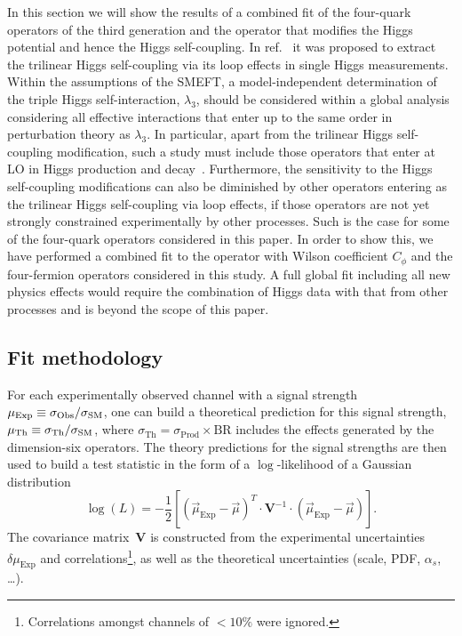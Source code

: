 \par In this section we will show the results of a combined fit of the four-quark operators of the third generation and the operator that modifies the Higgs potential and hence the Higgs self-coupling. In ref.~\cite{Gorbahn:2016uoy, Degrassi:2016wml, Bizon:2016wgr, Maltoni:2017ims, Degrassi:2021uik} it was proposed to extract the trilinear Higgs self-coupling via its loop effects in single Higgs measurements. 
%
Within the assumptions of the SMEFT, a model-independent determination of the triple Higgs self-interaction, $\lambda_3$, should be considered within a global analysis considering all effective interactions that enter up to the same order in perturbation theory as $\lambda_3$.
In particular, apart from the trilinear Higgs self-coupling modification, such a study must include those operators that enter at LO in Higgs production and decay~\cite{DiVita:2017eyz}. Furthermore, the sensitivity to the Higgs self-coupling modifications can also be diminished by other operators entering as the trilinear Higgs self-coupling via loop effects, if those operators are not yet strongly constrained experimentally by other processes. Such is the case for some of the four-quark operators considered in this paper. In order to show this, we have performed a combined fit to the operator with Wilson coefficient $C_{\phi}$ and the four-fermion operators considered in this study. A full global fit including all new physics effects would require the combination of Higgs data with that from other processes and is beyond the scope of this paper. 

\subsection{Fit methodology}
%

For each experimentally observed channel with a signal strength~$\mu_{\mathrm{Exp}}\equiv \sigma_{\mathrm{Obs}}/\sigma_{\mathrm{SM}}$, one can build a theoretical prediction for this signal strength, $\mu_{\mathrm{Th}}\equiv \sigma_{\mathrm{Th}}/\sigma_{\mathrm{SM}}$, where $\sigma_{\mathrm{Th}}=\sigma_{\mathrm{Prod}}\times \mathrm{BR}$ includes the effects generated by the dimension-six operators. 
The theory predictions for the signal strengths are then used to build a test statistic in the form of  a $\log$-likelihood of a Gaussian distribution 
\begin{equation}
	\log(L) = -\frac{1}{2}\left[  (\vec{\mu}_{\mathrm{Exp}} -\vec{\mu} ) ^{T} \cdot \mathbf{V}^{-1} \cdot ( \vec{\mu}_{\mathrm{Exp}} -\vec{\mu} )\right]  .
	\label{eq:loglike}
\end{equation}
The covariance matrix~$\mathbf{V}$ is constructed from the experimental uncertainties $\delta \mu_{\mathrm{Exp}}$ and correlations\footnote{Correlations amongst channels of $< 10\%$ were ignored.},  as well as the theoretical uncertainties (scale, PDF, $\alpha_s$, \ldots).

